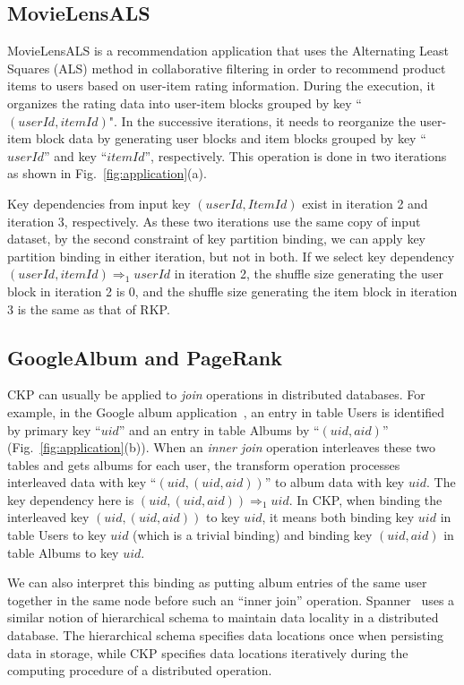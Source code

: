 \documentclass[10pt,journal,compsoc]{IEEEtran}
\begin{document}
\subsection{MovieLensALS}
MovieLensALS \cite{movielensals} is a
recommendation application that uses the Alternating Least Squares (ALS)
method in collaborative filtering in order to recommend product
items to users based on user-item rating information.
During the execution, it organizes the rating data into user-item
blocks grouped by key ``$(userId, itemId)$".
In the successive iterations, it needs to reorganize the user-item block
data by generating user blocks and item blocks grouped by
key ``$userId$'' and key ``$itemId$'', respectively.
This operation is done in two iterations as shown in Fig.~\ref{fig:application}(a). 

Key dependencies from input key $(userId, ItemId)$ exist in
iteration 2 and iteration 3, respectively.
As these two iterations use the same copy of input dataset, 
by the second constraint of key partition binding, 
we can apply key partition binding in either iteration, 
but not in both.
If we select key dependency $(userId, itemId) \Rightarrow_1
userId$ in iteration 2, the shuffle size generating the user block 
in iteration 2 is $0$, 
and the shuffle size generating the item block in iteration 3 
is the same as that of RKP.


\subsection{GoogleAlbum and PageRank}\label{section:pagerank}
CKP can usually be applied to \emph{join} operations in distributed databases.
For example, in the Google album application~\cite{google2012spanner}, 
an entry in table Users is identified by primary key ``$uid$''
and an entry in table Albums by ``$(uid, aid)$'' (Fig.~\ref{fig:application}(b)). 
When an \emph{inner join} operation interleaves these two tables and gets albums for 
each user, the transform operation processes interleaved data 
with key ``$(uid, (uid, aid))$'' to album data with key $uid$. 
The key dependency here is $(uid, (uid, aid)) \Rightarrow_{1} uid$.
In CKP, when binding the interleaved key $(uid, (uid, aid))$ to key $uid$, 
it means both binding key $uid$ in table Users to key $uid$ (which is a trivial binding)
and binding key $(uid, aid)$ in table Albums to key $uid$. 

We can also interpret this binding as putting album entries 
of the same user together
in the same node before such an ``inner join'' operation.
Spanner~\cite{google2012spanner} uses a similar notion of 
hierarchical schema to maintain data locality in a distributed database. 
The hierarchical schema specifies data locations once when persisting data in storage, 
while CKP specifies data locations iteratively during the computing procedure of a distributed operation.
\end{document}
